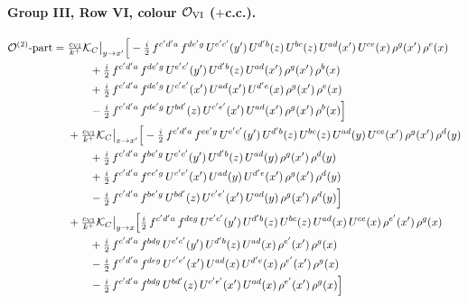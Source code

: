 \documentclass[10pt]{article}
\numberwithin{equation}{section}
\newcommand{\OO}{\mathcal O}
\newcommand{\KK}{\mathcal K}
\begin{document}
\paragraph{Group III, Row VI, colour $\OO_{\rm VI}$ ($+$c.c.).}
\begin{align}
\OO^{(2)}\text{-part}={}&\tfrac{c_{\rm VI}}{k^+}\KK_C\big|_{y\to x'}\Big[-\tfrac{i}{2}\,f^{c'd'a}\,f^{de'g}\,U^{e'c'}(y')\,U^{d'b}(z)\,U^{bc}(z)\,U^{ad}(x')\,U^{ce}(x)\,\rho^{g}(x')\,\rho^{e}(x)\notag\\
&\qquad+\tfrac{i}{2}\,f^{c'd'a}\,f^{de'g}\,U^{e'c'}(y')\,U^{d'b}(z)\,U^{ad}(x')\,\rho^{g}(x')\,\rho^{b}(x)\notag\\
&\qquad+\tfrac{i}{2}\,f^{c'd'a}\,f^{de'g}\,U^{c'e'}(x')\,U^{ad}(x')\,U^{d'e}(x)\,\rho^{g}(x')\,\rho^{e}(x)\notag\\
&\qquad-\tfrac{i}{2}\,f^{c'd'a}\,f^{de'g}\,U^{bd'}(z)\,U^{c'e'}(x')\,U^{ad}(x')\,\rho^{g}(x')\,\rho^{b}(x)\Big]\notag\\
&+\tfrac{c_{\rm VI}}{k^+}\KK_C\big|_{x\to x'}\Big[-\tfrac{i}{2}\,f^{c'd'a}\,f^{ee'g}\,U^{e'c'}(y')\,U^{d'b}(z)\,U^{bc}(z)\,U^{ad}(y)\,U^{ce}(x')\,\rho^{g}(x')\,\rho^{d}(y)\notag\\
&\qquad+\tfrac{i}{2}\,f^{c'd'a}\,f^{be'g}\,U^{e'c'}(y')\,U^{d'b}(z)\,U^{ad}(y)\,\rho^{g}(x')\,\rho^{d}(y)\notag\\
&\qquad+\tfrac{i}{2}\,f^{c'd'a}\,f^{ee'g}\,U^{c'e'}(x')\,U^{ad}(y)\,U^{d'e}(x')\,\rho^{g}(x')\,\rho^{d}(y)\notag\\
&\qquad-\tfrac{i}{2}\,f^{c'd'a}\,f^{be'g}\,U^{bd'}(z)\,U^{c'e'}(x')\,U^{ad}(y)\,\rho^{g}(x')\,\rho^{d}(y)\Big]\notag\\
&+\tfrac{c_{\rm VI}}{k^+}\KK_C\big|_{y\to x}\Big[\tfrac{i}{2}\,f^{c'd'a}\,f^{deg}\,U^{e'c'}(y')\,U^{d'b}(z)\,U^{bc}(z)\,U^{ad}(x)\,U^{ce}(x)\,\rho^{e'}(x')\,\rho^{g}(x)\notag\\
&\qquad+\tfrac{i}{2}\,f^{c'd'a}\,f^{bdg}\,U^{e'c'}(y')\,U^{d'b}(z)\,U^{ad}(x)\,\rho^{e'}(x')\,\rho^{g}(x)\notag\\
&\qquad-\tfrac{i}{2}\,f^{c'd'a}\,f^{deg}\,U^{c'e'}(x')\,U^{ad}(x)\,U^{d'e}(x)\,\rho^{e'}(x')\,\rho^{g}(x)\notag\\
&\qquad-\tfrac{i}{2}\,f^{c'd'a}\,f^{bdg}\,U^{bd'}(z)\,U^{c'e'}(x')\,U^{ad}(x)\,\rho^{e'}(x')\,\rho^{g}(x)\Big]
\end{align}

\end{document}

